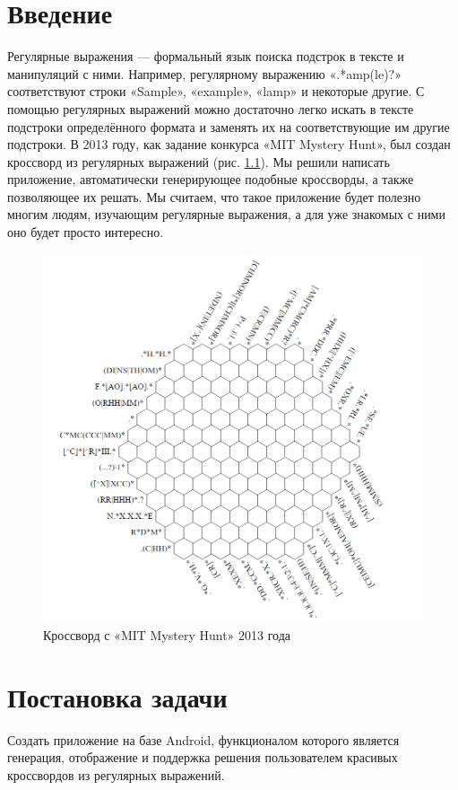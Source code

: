 \documentclass[12pt]{report}
\begin{document}
\chapter{Введение}
Регулярные выражения — формальный язык поиска подстрок в тексте и манипуляций с ними. Например, регулярному выражению «.*amp(le)?» соответствуют строки «Sample», «example», «lamp» и некоторые другие. С помощью регулярных выражений можно достаточно легко искать в тексте подстроки определённого формата и заменять их на соответствующие им другие подстроки. В 2013 году, как задание конкурса «MIT Mystery Hunt», был создан кроссворд из регулярных выражений (рис. \ref{pic:MITHex}). Мы решили написать приложение, автоматически генерирующее подобные кроссворды, а также позволяющее их решать. Мы считаем, что такое приложение будет полезно многим людям, изучающим регулярные выражения, а для уже знакомых с ними оно будет просто интересно.
 \begin{figure}[ht!]
 \centering
    \includegraphics[width=.7\textwidth]{MITHexagon.png}
    \caption{\label{pic:MITHex}Кроссворд с «MIT Mystery Hunt» 2013 года}
\end{figure}

    \newpage %
   \chapter{Постановка задачи}
   
   Создать приложение на базе Android, функционалом которого является генерация, отображение и поддержка решения пользователем красивых кроссвордов из регулярных выражений.
   
\end{document}
